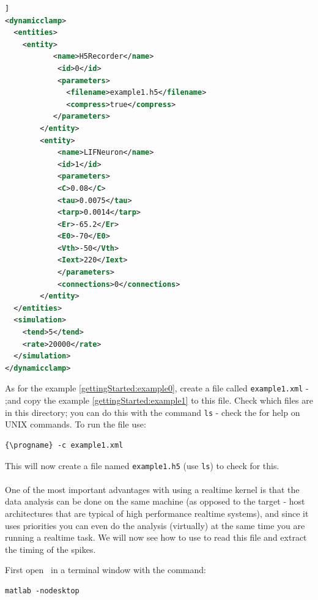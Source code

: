 \begin{lstlisting}[caption={Example of a configuration file with a the H5Recorder entity.},label={gettingStarted:example1},language=XML,morekeywords={dynamic clamp,entities,entity,name,id,filename,compress,C,tau,tarp,Er,E0,Vth,Iext,parameters,connections,simulation,tend,rate}]]
<dynamicclamp>
  <entities>
  	<entity>
 	       <name>H5Recorder</name>
        	<id>0</id>
        	<parameters>
		      <filename>example1.h5</filename>
		      <compress>true</compress>
	       </parameters>
    	</entity>
    	<entity>
      		<name>LIFNeuron</name>
      		<id>1</id>
      		<parameters>
			<C>0.08</C>
			<tau>0.0075</tau>
			<tarp>0.0014</tarp>
			<Er>-65.2</Er>
			<E0>-70</E0>
			<Vth>-50</Vth>
			<Iext>220</Iext>
      		</parameters>
      		<connections>0</connections>
    	</entity>
  </entities>
  <simulation>
  	<tend>5</tend>
   	<rate>20000</rate>
  </simulation>
</dynamicclamp>

\end{lstlisting}

As for the example \ref{gettingStarted:example0}, create a file called \texttt{example1.xml}  - ;and copy the example \ref{gettingStarted:example1} to this file. Check which files are in this directory; you can do this with the command \texttt{ls} - check the  for help on UNIX commands. To run the file use:
\begin{lstlisting}[escapeinside=\{\}]
{\progname} -c example1.xml
\end{lstlisting}

This will now create a file named \texttt{example1.h5} (use \texttt{ls}) to check for this.

\paragraph{} One of the most important advantages with using a realtime kernel is that the data analysis can be done on the same machine (as opposed to the target - host architectures that are typical of high performance realtime systems), and since it uses priorities you can even do the analysis (virtually) at the same time you are running a realtime task. We will now see how to use \textbf{\matlab} to read this file and extract the timing of the spikes. 

First open \matlab\ in a terminal window with the command: 
\begin{lstlisting} 
matlab -nodesktop 
\end{lstlisting}

